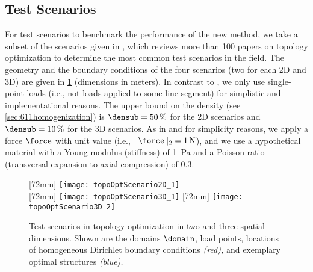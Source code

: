 \subsection{Test Scenarios}
\label{sec:632scenarios}


For test scenarios to benchmark the performance of the new method,
we take a subset of the scenarios given in \cite{Valdez17Topology},
which reviews more than 100 papers on topology optimization
to determine the most common test scenarios in the field.
The geometry and the boundary conditions of the
four scenarios (two for each 2D and 3D)
are given in \cref{fig:topoOptScenario} (dimensions in meters).
In contrast to \cite{Valdez17Topology},
we only use single-point loads
(i.e., not loads applied to some line segment)
for simplistic and implementational reasons.
The upper bound on the density (see \cref{sec:611homogenization})
is $\densub = \SI{50}{\percent}$ for the 2D scenarios and
$\densub = \SI{10}{\percent}$ for the 3D scenarios.
As in \cite{Sigmund01Line} and for simplicity reasons,
we apply a force $\force$ with unit value
(i.e., $\norm[2]{\force} = \SI{1}{\newton}$),
and we use a hypothetical material with
a Young modulus (stiffness) of \SI{1}{\pascal} and
a Poisson ratio (transversal expansion to axial compression) of $0.3$.

\begin{figure}
  [72mm]{%
    \texttt{[image: topoOptScenario2D\_1]}%
  }%
  \hfill%
  \\[7mm]%
  [72mm]{%
    \texttt{[image: topoOptScenario3D\_1]}%
  }%
  \hfill%
  [72mm]{%
    \texttt{[image: topoOptScenario3D\_2]}%
  }%
  \caption[Test scenarios in topology optimization]{%
    Test scenarios in topology optimization in
    two and three spatial dimensions.
    Shown are
    the domains $\domain$,
    load points,
    locations of homogeneous Dirichlet boundary conditions
    \emph{\textcolor{C1}{(red)},} and
    exemplary optimal structures \emph{\textcolor{C0}{(blue)}.}%
  }%
  \label{fig:topoOptScenario}%
\end{figure}

%
